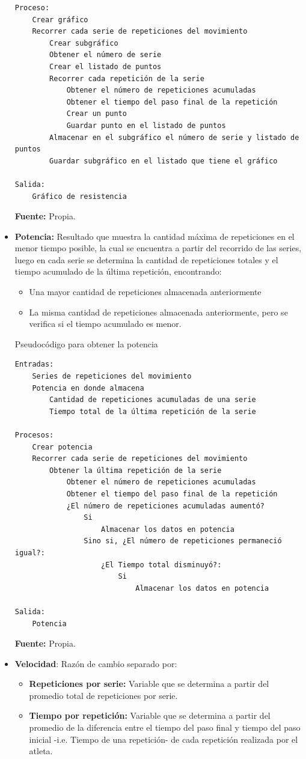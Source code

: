 \begin{itemize}
\begin{code}[H]
\begin{lstlisting}
Proceso:
	Crear gráfico
	Recorrer cada serie de repeticiones del movimiento
		Crear subgráfico
		Obtener el número de serie
		Crear el listado de puntos
		Recorrer cada repetición de la serie
			Obtener el número de repeticiones acumuladas 
			Obtener el tiempo del paso final de la repetición
			Crear un punto
			Guardar punto en el listado de puntos
		Almacenar en el subgráfico el número de serie y listado de puntos
		Guardar subgráfico en el listado que tiene el gráfico

Salida:
	Gráfico de resistencia
	\end{lstlisting}
	\textbf{Fuente:} Propia.
\end{code} 

\item \textbf{Potencia:} Resultado que muestra la cantidad m\'axima de repeticiones en el menor tiempo posible, la cual se encuentra a partir del recorrido de las series, luego en cada serie se determina la cantidad de repeticiones totales y el tiempo acumulado de la \'ultima repetici\'on, encontrando: 
	\begin{itemize}
	\item Una mayor cantidad de repeticiones almacenada anteriormente
	\item La misma cantidad de repeticiones almacenada anteriormente, pero se verifica si el tiempo acumulado es menor.
	\end{itemize}
\begin{code}[H]
	\caption{Pseudoc\'odigo para obtener la potencia}
	\label{code:getEndurance}
	\begin{lstlisting}
Entradas:
	Series de repeticiones del movimiento
	Potencia en donde almacena
		Cantidad de repeticiones acumuladas de una serie
		Tiempo total de la última repetición de la serie
		
Procesos:
	Crear potencia
	Recorrer cada serie de repeticiones del movimiento
		Obtener la última repetición de la serie
			Obtener el número de repeticiones acumuladas
			Obtener el tiempo del paso final de la repetición
			¿El número de repeticiones acumuladas aumentó?
				Si
					Almacenar los datos en potencia
				Sino si, ¿El número de repeticiones permaneció igual?:
					¿El Tiempo total disminuyó?:
						Si
							Almacenar los datos en potencia
						
Salida:
	Potencia 
	\end{lstlisting}
	\textbf{Fuente:} Propia.
\end{code} 

\item \textbf{Velocidad}: Raz\'on de cambio separado por:
	\begin{itemize}
	\item \textbf{Repeticiones por serie:} Variable que se determina a partir del promedio total de repeticiones por serie.
		\item \textbf{Tiempo por repetici\'on:} Variable que se determina a partir del promedio de la diferencia entre el tiempo del paso final y tiempo del paso inicial -i.e. Tiempo de una repetici\'on- de cada repetici\'on realizada por el atleta.
	\end{itemize}
\end{itemize}


